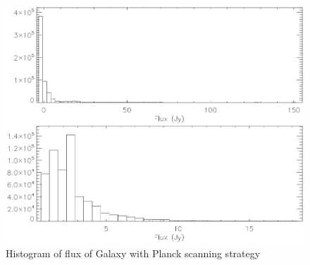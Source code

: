 \begin{figure}[h]
  \includegraphics[clip,angle=0,width=\columnwidth]{Figures/histo_galaxy_dipole.eps}
  \caption{Histogram of flux of Galaxy with Planck scanning strategy}
  \label{fig:histo_galaxy_dipole}
\end{figure}

%


